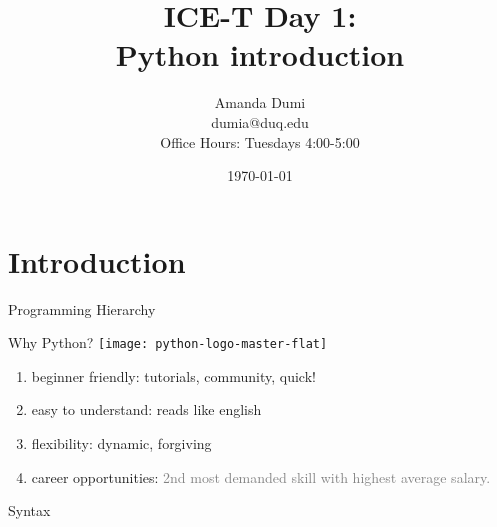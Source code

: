 \documentclass[xcolor=x11names,compress]{beamer}
\title[{\makebox[.5\paperwidth]{General Chemistry Recitation 1\hfill
       \insertframenumber/\inserttotalframenumber}}]{ICE-T Day 1:\\
Python introduction}
\author[\quad Amanda \quad\quad\quad\quad aed63@pitt.edu]{Amanda Dumi\\
dumia@duq.edu\\
Office Hours:
Tuesdays 4:00-5:00\\
}
\date{\small{\today}}
\renewcommand{\(}{\begin{columns}}
\renewcommand{\)}{\end{columns}}
\newcommand{\<}[1]{\begin{column}{#1}}
\renewcommand{\>}{\end{column}}
\begin{document}
\section{Introduction}
\begin{frame}
\titlepage
\end{frame}
\begin{frame}{Programming Hierarchy}
    \begin{center}
\end{center}
\end{frame}
    \begin{frame}{Why Python?}
\texttt{[image: python-logo-master-flat]}
\begin{enumerate}[label=$\bullet$]
\item<1-> \textcolor{darkcoral}{beginner friendly: } \textcolor<2->{gray!30}{tutorials, community, quick!}
\item<2-> \textcolor{darkcoral}{easy to understand:} \textcolor<3->{gray!30}{reads like english}
\item<3-> \textcolor{darkcoral}{flexibility:} \textcolor<4->{gray!30}{dynamic, forgiving}
\item<4-> \textcolor{darkcoral}{career opportunities:} \textcolor<5->{gray}{2nd most demanded skill with highest average salary.\autocite{http://www.bestprogramminglanguagefor.me/why-learn-python}}
\end{enumerate}
\end{frame}
\begin{frame}{Syntax}
\end{frame}
\end{document}
